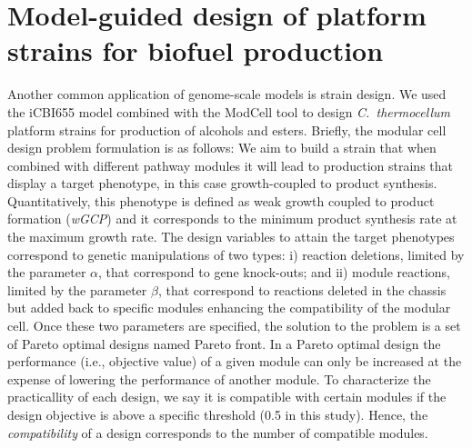 \section{Model-guided design of platform strains for biofuel production}

Another common application of genome-scale models is strain design. \citep{long2015, ng2015, maranas2016, wang2018, garcia2019, garcia2019b, garcia2019c}
We used the iCBI655 model combined with the ModCell tool\citep{garcia2020b} to design \textit{C.~thermocellum} platform strains for production of alcohols and esters.
Briefly, the modular cell design problem formulation is as follows: We aim to build a strain that when combined with different pathway modules it will lead to production strains that display a target phenotype, in this case growth-coupled to product synthesis. Quantitatively, this phenotype is defined as weak growth coupled to product formation (\textit{wGCP}) and it corresponds to the minimum product synthesis rate at the maximum growth rate.
The design variables to attain the target phenotypes correspond to genetic manipulations of two types: i) reaction deletions, limited by the parameter $\alpha$, that correspond to gene knock-outs; and ii) module reactions, limited by the parameter $\beta$, that correspond to reactions deleted in the chassis but added back to specific modules enhancing the compatibility of the modular cell. Once these two parameters are specified, the solution to the problem is a set of Pareto optimal designs named Pareto front. In a Pareto optimal design the performance (i.e., objective value) of a given module can only be increased at the expense of lowering the performance of another module.
To characterize the practicallity of each design, we say it is compatible with certain modules if the design objective is above a specific threshold (0.5 in this study). Hence, the \emph{compatibility} of a design corresponds to the number of compatible modules.

